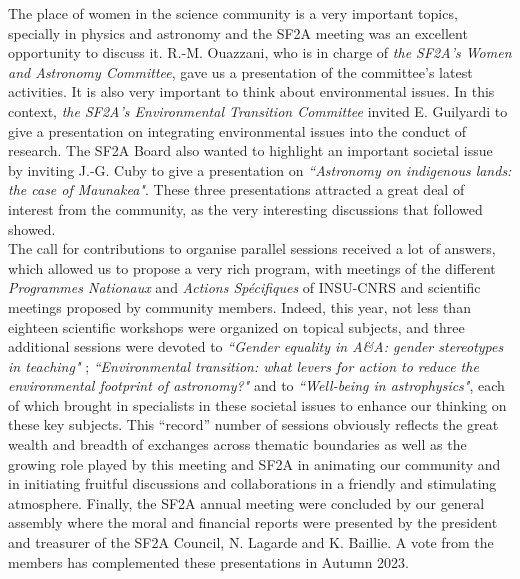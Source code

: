 The place of women in the science community is a very important topics, specially in physics and astronomy and the SF2A meeting was an excellent opportunity to discuss it.
R.-M. Ouazzani, who is in charge of \textit{the SF2A's Women and Astronomy Committee}, gave us a presentation of the committee's latest activities. It is also very important to think about environmental issues. In this context, \textit{the SF2A's Environmental Transition Committee} invited E. Guilyardi to give a presentation on integrating environmental issues into the conduct of research. The SF2A Board also wanted to highlight an important societal issue by inviting J.-G. Cuby to give a presentation on \textit{``Astronomy on indigenous lands: the case of Maunakea"}. These three presentations attracted a great deal of interest from the community, as the very interesting discussions that followed showed. \\

The call for contributions to organise parallel sessions received a lot of answers, which allowed us to propose a very rich program, with meetings of the different \emph{Programmes Nationaux} and \emph{Actions Sp\'ecifiques} of INSU-CNRS and scientific meetings proposed by community members. Indeed, this year, not less than eighteen scientific workshops were organized on topical subjects, and three additional sessions were devoted to \textit{``Gender equality in A\&A: gender stereotypes in teaching"} ; \textit{``Environmental transition: what levers for action to reduce the environmental footprint of astronomy?"} and to \textit{``Well-being in astrophysics"}, each of which brought in specialists in these societal issues to enhance our thinking on these key subjects. This “record” number of sessions obviously reflects the great wealth and breadth of exchanges across thematic boundaries as well as the growing role played by this meeting and SF2A in animating our community and in initiating fruitful discussions and collaborations in a friendly and stimulating atmosphere.
Finally, the SF2A annual meeting were concluded by our general assembly where the moral and financial reports were presented by the president and treasurer of the SF2A Council, N. Lagarde and K. Baillie. A vote from the members has complemented these presentations in Autumn 2023.\\

